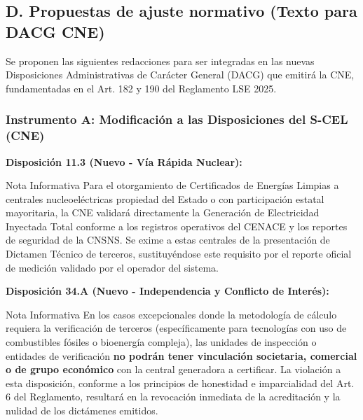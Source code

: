 \documentclass{cel}
\begin{document}
\subsection{D. Propuestas de ajuste normativo (Texto para DACG CNE)}
\nopagebreak

Se proponen las siguientes redacciones para ser integradas en las nuevas Disposiciones Administrativas de Carácter General (DACG) que emitirá la CNE, fundamentadas en el Art. 182 y 190 del Reglamento LSE 2025.


\subsubsection{Instrumento A: Modificación a las Disposiciones del S-CEL (CNE)}
\nopagebreak

\textbf{Disposición 11.3 (Nuevo - Vía Rápida Nuclear):}


\vspace{0.2cm}
\begin{glowBox}[gobmxDorado]{Nota Informativa}
\textquotedbl{}Para el otorgamiento de Certificados de Energías Limpias a centrales nucleoeléctricas propiedad del Estado o con participación estatal mayoritaria, la CNE validará directamente la Generación de Electricidad Inyectada Total conforme a los registros operativos del CENACE y los reportes de seguridad de la CNSNS. Se exime a estas centrales de la presentación de Dictamen Técnico de terceros, sustituyéndose este requisito por el reporte oficial de medición validado por el operador del sistema.\textquotedbl{}
\end{glowBox}

\textbf{Disposición 34.A (Nuevo - Independencia y Conflicto de Interés):}


\vspace{0.2cm}
\begin{glowBox}[gobmxDorado]{Nota Informativa}
\textquotedbl{}En los casos excepcionales donde la metodología de cálculo requiera la verificación de terceros (específicamente para tecnologías con uso de combustibles fósiles o bioenergía compleja), las unidades de inspección o entidades de verificación \textbf{no podrán tener vinculación societaria, comercial o de grupo económico} con la central generadora a certificar. La violación a esta disposición, conforme a los principios de honestidad e imparcialidad del Art. 6 del Reglamento, resultará en la revocación inmediata de la acreditación y la nulidad de los dictámenes emitidos.\textquotedbl{}
\end{glowBox}
\end{document}

